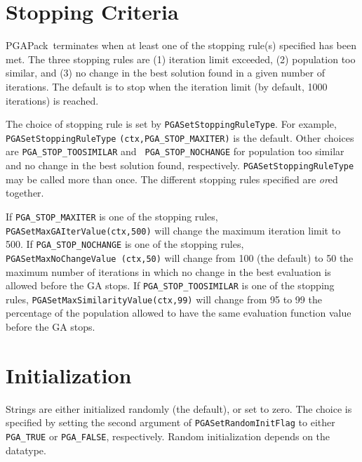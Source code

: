 \documentclass{report}
\newcommand{\pga}{PGAPack}
\begin{document}
\section{Stopping Criteria}\label{sec:stopping-criteria}

\pga\  terminates when at least one of the stopping
rule(s) specified has been met.  The three stopping rules are (1) iteration
limit exceeded, (2) population too similar, and (3) no change in the best
solution found in a given number of iterations.  The default is to stop when
the iteration limit (by default, 1000 iterations) is reached.

The choice of stopping rule is set by {\tt PGASetStoppingRuleType}.  For
example, {\tt PGASetStoppingRuleType} {\tt (ctx,PGA\_STOP\_MAXITER)} is the
default.  Other choices are {\tt PGA\_STOP\_TOOSIMILAR} and {\tt
PGA\_STOP\_NOCHANGE} for population too similar and no change in the best
solution found, respectively.  {\tt PGASetStoppingRuleType} may be called more
than once. The different stopping rules specified are {\em or}ed together.

If {\tt PGA\_STOP\_MAXITER} is one of the stopping rules, {\tt
PGASetMaxGAIterValue(ctx,500)} will change the maximum iteration limit to 500.
If {\tt PGA\_STOP\_NOCHANGE} is one of the stopping rules, {\tt
PGASetMaxNoChangeValue (ctx,50)} will change from 100 (the default) to 50 the
maximum number of iterations in which no change in the best evaluation is
allowed before the GA stops.  If {\tt PGA\_STOP\_TOOSIMILAR} is one of the
stopping rules, {\tt PGASetMaxSimilarityValue(ctx,99)} will change from 95 to
99 the percentage of the population allowed to have the same evaluation
function value before the GA stops.


\section{Initialization}\label{sec:initialization}

Strings are either initialized randomly (the default),
or set to zero.  The choice is specified by setting the second argument of
{\tt PGASetRandomInitFlag} to either {\tt PGA\_TRUE} or {\tt PGA\_FALSE},
respectively.  Random initialization depends on the datatype.
\end{document}
